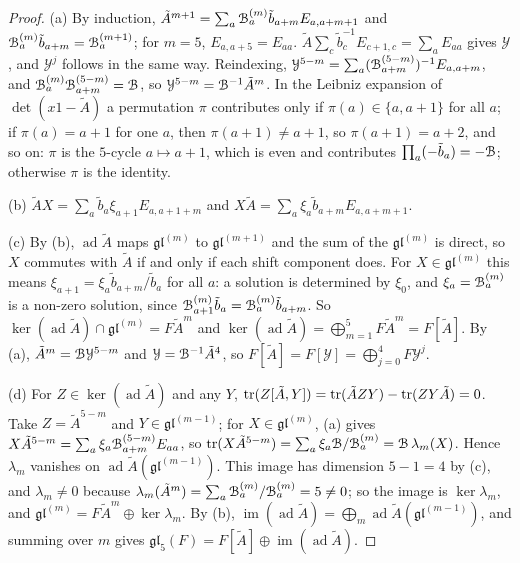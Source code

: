 \begin{proof}
(a) By induction, $\tilde A^{m+1}=\sum_a\mathcal{B}^{(m)}_a\tilde b_{a+m}E_{a,a+m+1}$ and $\mathcal{B}^{(m)}_a\tilde b_{a+m}=\mathcal{B}^{(m+1)}_a$; for $m=5$, $E_{a,a+5}=E_{aa}$. $\tilde A\sum_c\tilde b_c^{-1}E_{c+1,c}=\sum_aE_{aa}$ gives $\mathcal Y$, and $\mathcal Y^j$ follows in the same way. Reindexing, $\mathcal Y^{5-m}=\sum_a(\mathcal{B}^{(5-m)}_{a+m})^{-1}E_{a,a+m}$, and $\mathcal{B}^{(m)}_a\mathcal{B}^{(5-m)}_{a+m}=\mathcal{B}$, so $\mathcal Y^{5-m}=\mathcal{B}^{-1}\tilde A^m$. In the Leibniz expansion of $\det(x1-\tilde A)$ a permutation $\pi$ contributes only if $\pi(a)\in\{a,a+1\}$ for all $a$; if $\pi(a)=a+1$ for one $a$, then $\pi(a+1)\neq a+1$, so $\pi(a+1)=a+2$, and so on: $\pi$ is the $5$-cycle $a\mapsto a+1$, which is even and contributes $\prod_a(-\tilde b_a)=-\mathcal{B}$; otherwise $\pi$ is the identity.

(b) $\tilde AX=\sum_a\tilde b_a\xi_{a+1}E_{a,a+1+m}$ and $X\tilde A=\sum_a\xi_a\tilde b_{a+m}E_{a,a+m+1}$.

(c) By (b), $\operatorname{ad}\tilde A$ maps $\mathfrak{gl}^{(m)}$ to $\mathfrak{gl}^{(m+1)}$ and the sum of the $\mathfrak{gl}^{(m)}$ is direct, so $X$ commutes with $\tilde A$ if and only if each shift component does. For $X\in\mathfrak{gl}^{(m)}$ this means $\xi_{a+1}=\xi_a\tilde b_{a+m}/\tilde b_a$ for all $a$: a solution is determined by $\xi_0$, and $\xi_a=\mathcal{B}^{(m)}_a$ is a non-zero solution, since $\mathcal{B}^{(m)}_{a+1}\tilde b_a=\mathcal{B}^{(m)}_a\tilde b_{a+m}$. So $\ker(\operatorname{ad}\tilde A)\cap\mathfrak{gl}^{(m)}=F\tilde A^m$ and $\ker(\operatorname{ad}\tilde A)=\bigoplus_{m=1}^5F\tilde A^m=F[\tilde A]$. By (a), $\tilde A^m=\mathcal{B}\mathcal Y^{5-m}$ and $\mathcal Y=\mathcal{B}^{-1}\tilde A^4$, so $F[\tilde A]=F[\mathcal Y]=\bigoplus_{j=0}^4F\mathcal Y^j$.

(d) For $Z\in\ker(\operatorname{ad}\tilde A)$ and any $Y$, $\operatorname{tr}(Z[\tilde A,Y])=\operatorname{tr}(\tilde AZY)-\operatorname{tr}(Z Y\tilde A)=0$. Take $Z=\tilde A^{5-m}$ and $Y\in\mathfrak{gl}^{(m-1)}$; for $X\in\mathfrak{gl}^{(m)}$, (a) gives $X\tilde A^{5-m}=\sum_a\xi_a\mathcal{B}^{(5-m)}_{a+m}E_{aa}$, so $\operatorname{tr}(X\tilde A^{5-m})=\sum_a\xi_a\mathcal{B}/\mathcal{B}^{(m)}_a=\mathcal{B}\,\lambda_m(X)$. Hence $\lambda_m$ vanishes on $\operatorname{ad}\tilde A(\mathfrak{gl}^{(m-1)})$. This image has dimension $5-1=4$ by (c), and $\lambda_m\neq0$ because $\lambda_m(\tilde A^m)=\sum_a\mathcal{B}^{(m)}_a/\mathcal{B}^{(m)}_a=5\neq0$; so the image is $\ker\lambda_m$, and $\mathfrak{gl}^{(m)}=F\tilde A^m\oplus\ker\lambda_m$. By (b), $\operatorname{im}(\operatorname{ad}\tilde A)=\bigoplus_m\operatorname{ad}\tilde A(\mathfrak{gl}^{(m-1)})$, and summing over $m$ gives $\mathfrak{gl}_5(F)=F[\tilde A]\oplus\operatorname{im}(\operatorname{ad}\tilde A)$.


\end{proof}
